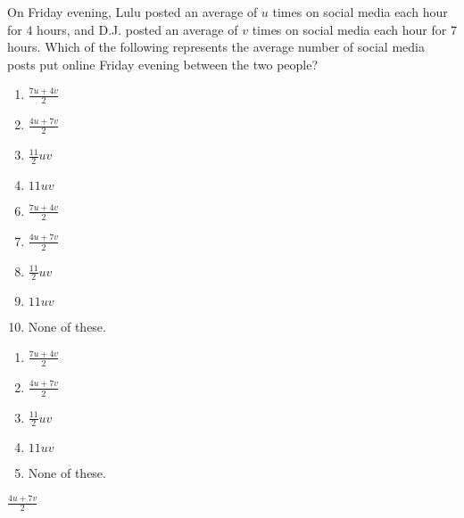  
On Friday evening, Lulu posted an average of $u$ times on social media each hour for $4$ hours, and D.J. posted an average of $v$ times on social media each hour for $7$ hours.  Which of the following represents the average number of social media posts put online Friday evening between the two people?


\ifsat
	\begin{enumerate}[label=\Alph*)]
		\item $\frac{7u+4v}{2}$
		\item $\frac{4u+7v}{2}$ %
		\item $\frac{11}{2}uv$
		\item $11uv$
	\end{enumerate}
\else
\fi

\ifacteven
	\begin{enumerate}[label=\textbf{\Alph*.},itemsep=\fill,align=left]
		\setcounter{enumii}{5}
		\item $\frac{7u+4v}{2}$
		\item $\frac{4u+7v}{2}$ %
		\item $\frac{11}{2}uv$
		\addtocounter{enumii}{1}
		\item $11uv$
		\item None of these. 
	\end{enumerate}
\else
\fi

\ifactodd
	\begin{enumerate}[label=\textbf{\Alph*.},itemsep=\fill,align=left]
		\item $\frac{7u+4v}{2}$
		\item $\frac{4u+7v}{2}$ %
		\item $\frac{11}{2}uv$
		\item $11uv$
		\item None of these. 
	\end{enumerate}
\else
\fi

\ifgridin
 $\frac{4u+7v}{2}$ %
		
\else
\fi

